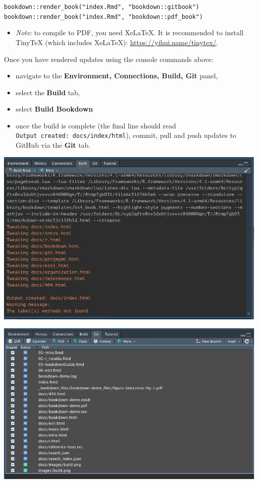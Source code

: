 \documentclass[
]{book}
\providecommand{\tightlist}{%
  \setlength{\itemsep}{0pt}\setlength{\parskip}{0pt}}
\begin{document}
\texttt{bookdown::render\_book("index.Rmd",\ "bookdown::gitbook")}
\texttt{bookdown::render\_book("index.Rmd",\ "bookdown::pdf\_book")}

\begin{itemize}
\tightlist
\item
  \emph{Note}: to compile to PDF, you need XeLaTeX. It is recommended to install TinyTeX (which includes XeLaTeX): \url{https://yihui.name/tinytex/}.
\end{itemize}

Once you have rendered updates using the console commands above:

\begin{itemize}
\tightlist
\item
  navigate to the \textbf{Environment, Connections, Build, Git} panel,
\item
  select the \textbf{Build} tab,
\item
  select \textbf{Build Bookdown}
\item
  once the build is complete (the final line should read \texttt{Output\ created:\ docs/index/html}), commit, pull and push updates to GitHub via the \textbf{Git} tab.
\end{itemize}

\begin{center}\includegraphics[width=11.28in]{images/build} \end{center}

\begin{center}\includegraphics[width=11.19in]{images/select} \end{center}
\end{document}
